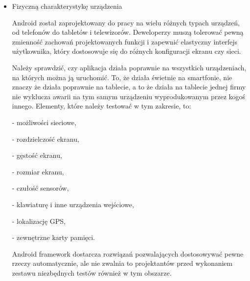 \begin{itemize}
Według dokumentacji Android\cite{website:android:manual} możliwe są następujące opcje przechowywania danych:

- \textit{Shared Preferences}, czyli zachowywanie podstawowych danych w parach klucz - wartość,

- pamięć wewnętrzna urządzenia - do zachowywania danych niepublicznych,

- zewnętrzna karta pamięci - do zachowywania danych publicznych,

- baza danych SQLite - do przechowywania danych w prywatnej bazie danych,

- zasoby sieciowe - jako baza danych współdzielona pomiędzy urządzeniami.

Wszystkie te opcje korzystają ze wspólnego zestawu funkcji\footnote{Na przykład do obsługi plików używa się \textit{getFileDir(), getDir(), deleteFile()} itp.}, które tester powinien wziąć pod uwagę przy tworzeniu przypadków testowych.

\item{Fizyczną charakterystykę urządzenia}

Android został zaprojektowany do pracy na wielu różnych typach urządzeń, od telefonów do tabletów i telewizorów. Deweloperzy muszą tolerować pewną zmienność zachowań projektowanych funkcji i zapewnić elastyczny interfejs użytkownika, który dostosowuje się do różnych konfiguracji ekranu czy sieci.

Należy sprawdzić, czy aplikacja działa poprawnie na wszystkich urządzeniach, na których można ją uruchomić. To, że działa świetnie na smartfonie, nie znaczy że działa poprawnie na tablecie, a to że działa na tablecie jednej firmy nie wyklucza awarii na tym samym urządzeniu wyprodukowanym przez kogoś innego. Elementy, które należy testować w tym zakresie, to:

- możliwości sieciowe,

- rozdzielczość ekranu,

- gęstość ekranu,

- rozmiar ekranu,

- czułość sensorów,

- klawiaturę i inne urządzenia wejściowe,

- lokalizację GPS,

- zewnętrzne karty pamięci.

Android framework dostarcza rozwiązań pozwalających dostosowywać pewne rzeczy automatycznie, ale nie zwalnia to projektantów przed wykonaniem zestawu niezbędnych testów również w tym obszarze.

\end{itemize}


